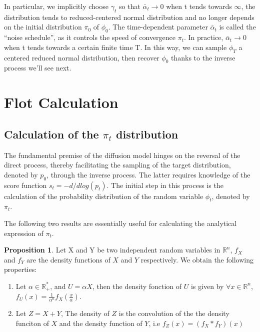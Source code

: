 \documentclass[a4paper,10pt]{article}
\theoremstyle{definition} %
\theoremstyle{definition} %
\newtheorem{proposition}[definition]{Proposition}
\theoremstyle{definition} %
\theoremstyle{definition} %
\newcommand{\R}{\mathbb{R}}
\begin{document}
In particular, we implicitly choose $\gamma_t$ so that $\bar \alpha_t \rightarrow 0$ when t tends towards $\infty$, the distribution tends to reduced-centered normal distribution and no longer depends on the initial  distribution $\pi_0$ of $\phi_0$. The time-dependent parameter $\bar \alpha_t$ is called the “noise schedule”, as it controls the speed of convergence $\pi_t$. In practice, $\bar \alpha_t \rightarrow 0$ when t tends towards a certain finite time T. In this way, we can sample $\phi_T$ a centered reduced normal distribution, then recover $\phi_0$ thanks to the inverse process we'll see next.
\section{Flot Calculation} \label{sec:calcul_numerique}
\subsection{Calculation of the $\pi_t$ distribution}

The fundamental premise of the diffusion model hinges on the reversal of the direct process, thereby facilitating the sampling of the target distribution, denoted by $p_0$, through the inverse process. The latter requires knowledge of the score function $s_t = -d/dlog(p_t)$. The initial step in this process is the calculation of the probability distribution of the random variable $\phi_t$, denoted by $\pi_t$.

The following two results are essentially useful for calculating the analytical expression of $\pi_t$.
\begin{proposition}\label{prop:quelques_resultats_sur_la_densite}
    Let X and Y be two independent random variables in $\R^n$, $f_X$ and $f_Y$ are the density functions of $X$ and $Y$ respectively. We obtain the following properties:
    \vspace{-10pt}
\begin{enumerate}[label=(\roman*)]
    \item Let $\alpha \in \R_+^*$, and $U = \alpha X$, then the density fonction of $U$ is given by $\forall x\in \R^n$, $f_U(x) = \frac{1}{\alpha^n} f_X(\frac{x}{\alpha})$.
    \item Let $Z = X+Y$, The density of $Z$ is the convolution of the the density funciton of $X$ and the density function of $Y$, i.e $f_Z(x) = (f_X * f_Y)(x)$
\end{enumerate}
\end{proposition}
\end{document}
